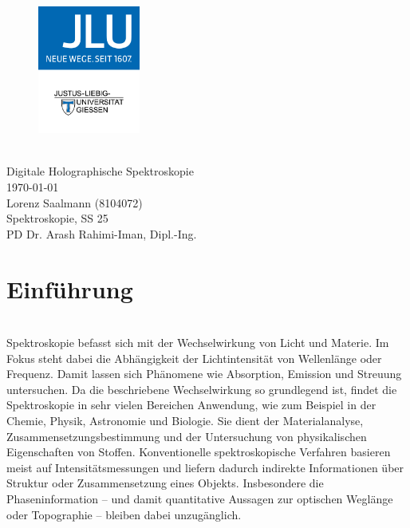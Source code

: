 \documentclass[10pt,twocolumn,a4paper]{article}
\begin{document}
\setlength{\parindent}{0pt}


\begin{titlepage}
    \centering
    \begin{figure}
        \centering
        \includegraphics[width=0.3\textwidth]{images/jlu_logo.jpeg}
    \end{figure}
    \vspace*{2cm}
     \\
    \Large{Digitale Holographische Spektroskopie} \\
    \vspace{2cm}
    \normalsize
    \today \\
    \normalsize{Lorenz Saalmann (8104072)} \\
    \vfill
    \normalsize{{Spektroskopie, SS 25}} \\
    \small{PD Dr. Arash Rahimi-Iman, Dipl.-Ing.} \\
\end{titlepage}

\newpage

\section{Einführung}
\vspace{-0.3cm}
\hspace{.0cm}
\vspace{0.4cm}
\\
\small
Spektroskopie befasst sich mit der Wechselwirkung von Licht und Materie. Im Fokus steht dabei die Abhängigkeit der Lichtintensität von Wellenlänge oder Frequenz. Damit lassen sich Phänomene wie Absorption, Emission und Streuung untersuchen. Da die beschriebene Wechselwirkung so grundlegend ist, findet die Spektroskopie in sehr vielen Bereichen Anwendung, wie zum Beispiel in der Chemie, Physik, Astronomie und Biologie. Sie dient der Materialanalyse, Zusammensetzungsbestimmung und der Untersuchung von physikalischen Eigenschaften von Stoffen. Konventionelle spektroskopische Verfahren basieren meist auf Intensitätsmessungen und liefern dadurch indirekte Informationen über Struktur oder Zusammensetzung eines Objekts. Insbesondere die Phaseninformation -- und damit quantitative Aussagen zur optischen Weglänge oder Topographie -- bleiben dabei unzugänglich.
\end{document}
